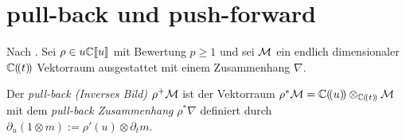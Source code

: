 \section{pull-back und push-forward}
\begin{comment}
\cite[1.3]{hotta2007d}
\end{comment}

Nach \cite[1.a]{sabbah_Fourier-local}. Sei $\rho\in u{\mathbb C\llbracket u\rrbracket}$ mit Bewertung
$p\geq1$ und sei $\mathcal{M}$ ein endlich dimensionaler $\mathbb{C}(\!(t)\!)$ Vektorraum
ausgestattet mit einem Zusammenhang $\nabla$.
\begin{defn}
\cite[1.a]{sabbah_Fourier-local}
Der \emph{pull-back (Inverses Bild)} $\rho^{+}\mathcal{M}$ ist der Vektorraum
$\rho^{*}\mathcal{M}=\mathbb{C}(\!(u)\!)\otimes_{\mathbb{C}(\!(t)\!)}\mathcal{M}$ mit dem \emph{pull-back
Zusammenhang} $\rho^*\nabla$ definiert durch $\partial_u(1\otimes
m):=\rho'(u)\otimes\partial_tm$.
\end{defn}

